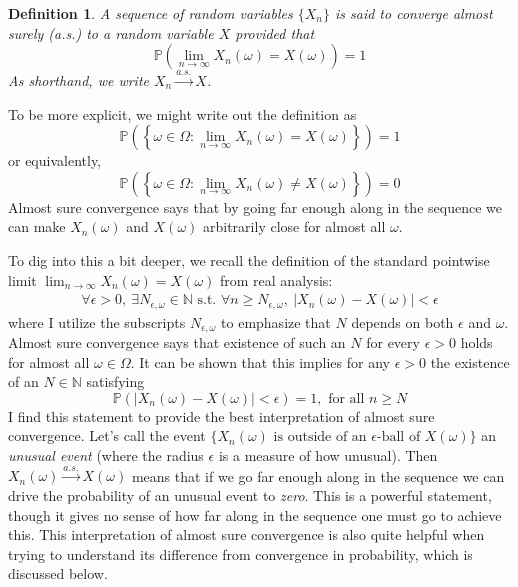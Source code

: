\documentclass[12pt]{article}
\newcommand*{\abs}[1]{\left\lvert#1\right\rvert}
\newcommand{\Prob}{\mathbb{P}}
\newtheorem{definition}{Definition}
\begin{document}
\begin{definition}
A sequence of random variables $\{X_n\}$ is said to converge almost surely (a.s.) to a random variable $X$ provided that 
\[\mathbb{P}\left(\lim_{n \to \infty} X_n(\omega) = X(\omega)\right) = 1\]
As shorthand, we write $X_n \overset{a.s.}{\to} X$.
\end{definition}  
To be more explicit, we might write out the definition as 
\[\mathbb{P}\left(\left\{\omega \in \Omega: \lim_{n \to \infty} X_n(\omega) = X(\omega)\right\} \right) = 1\]
or equivalently, 
\[\mathbb{P}\left(\left\{\omega \in \Omega: \lim_{n \to \infty} X_n(\omega) \neq X(\omega)\right\} \right) = 0\]
Almost sure convergence says that by going far enough along in the sequence we can make $X_n(\omega)$ and $X(\omega)$ arbitrarily close for almost all $\omega$.

To dig into this a bit deeper, we recall the definition of the standard pointwise limit $\lim_{n \to \infty} X_n(\omega) = X(\omega)$ from real analysis: 
\begin{align*}
\forall \epsilon > 0, \ \exists N_{\epsilon, \omega} \in \mathbb{N} \text{ s.t. } \forall n \geq N_{\epsilon, \omega}, \ \abs{X_n(\omega) - X(\omega)} < \epsilon 
\end{align*} 
where I utilize the subscripts $N_{\epsilon, \omega}$ to emphasize that $N$ depends on both $\epsilon$ and $\omega$. Almost sure convergence says that existence of such an $N$ for 
every $\epsilon > 0$ holds for almost all $\omega \in \Omega$. It can be shown that this implies for any $\epsilon > 0$ the existence of an $N \in \mathbb{N}$ satisfying 
\[\Prob(\abs{X_n(\omega) - X(\omega)} < \epsilon) = 1, \text{ for all } n \geq N\]
I find this statement to provide the best interpretation of almost sure convergence. Let's call the event $\{X_n(\omega) \text{ is outside of an } \epsilon\text{-ball of } X(\omega)\}$ an \textit{unusual event} 
(where the radius $\epsilon$ is a measure of how unusual). Then $X_n(\omega) \overset{a.s.}{\to} X(\omega)$ means that if we go far enough along in the sequence we can drive the probability of 
an unusual event to \textit{zero}. This is a powerful statement, though it gives no sense of how far along in the sequence one must go to achieve this. This interpretation of almost sure convergence is also 
quite helpful when trying to understand its difference from convergence in probability, which is discussed below. 
\end{document}
